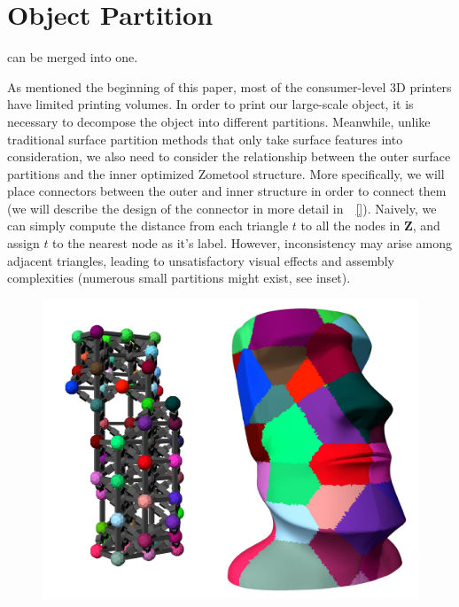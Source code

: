 \section{Object Partition}
\label{sec:surf_part}

 can be merged into one.

As mentioned  the beginning of this paper, most of the consumer-level 3D printers have limited printing volumes.
In order to print our large-scale object, it is necessary to decompose the object into different partitions.
Meanwhile, unlike traditional surface partition methods that only take surface features into consideration, we also need to consider the relationship between the outer surface partitions and the inner optimized Zometool structure.
More specifically, we will place connectors between the outer and inner structure in order to connect them (we will describe the design of the connector in more detail in~\secname~\ref{}).
Naively, we can simply compute the distance from each triangle $t$ to all the nodes in $\mathbf{Z}$, and assign $t$ to the nearest node as it's label.
However, inconsistency may arise among adjacent triangles, leading to unsatisfactory visual effects and assembly complexities (numerous small partitions might exist, see inset). 

\begin{figure}
    \centering
    \includegraphics[width=1.0\linewidth]{figs/nearest_node.pdf} 
    \label{fig:nearest}
\end{figure}

